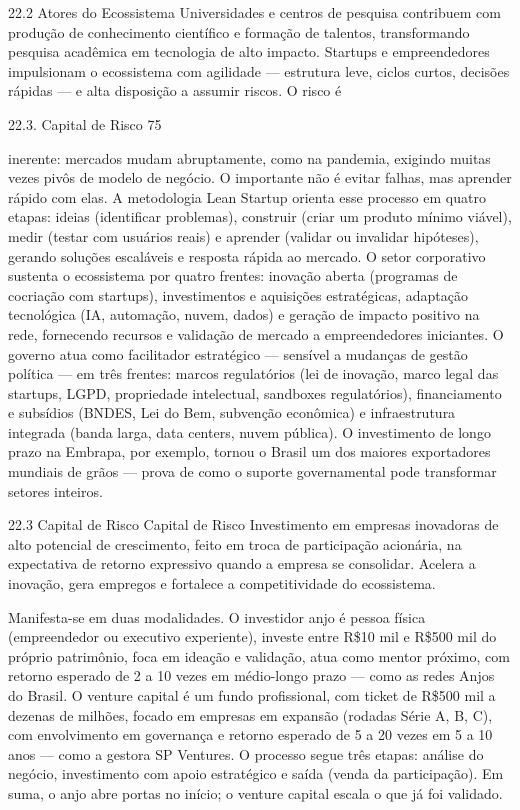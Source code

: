 22.2 Atores do Ecossistema Universidades e centros de pesquisa contribuem com produção de conhecimento científico e formação de talentos, transformando pesquisa acadêmica em tecnologia de alto impacto. Startups e empreendedores impulsionam o ecossistema com agilidade — estrutura leve, ciclos curtos, decisões rápidas — e alta disposição a assumir riscos. O risco é

22.3. Capital de Risco 75

inerente: mercados mudam abruptamente, como na pandemia, exigindo muitas vezes pivôs de modelo de negócio. O importante não é evitar falhas, mas aprender rápido com elas. A metodologia Lean Startup orienta esse processo em quatro etapas: ideias (identificar problemas), construir (criar um produto mínimo viável), medir (testar com usuários reais) e aprender (validar ou invalidar hipóteses), gerando soluções escaláveis e resposta rápida ao mercado. O setor corporativo sustenta o ecossistema por quatro frentes: inovação aberta (programas de cocriação com startups), investimentos e aquisições estratégicas, adaptação tecnológica (IA, automação, nuvem, dados) e geração de impacto positivo na rede, fornecendo recursos e validação de mercado a empreendedores iniciantes. O governo atua como facilitador estratégico — sensível a mudanças de gestão política — em três frentes: marcos regulatórios (lei de inovação, marco legal das startups, LGPD, propriedade intelectual, sandboxes regulatórios), financiamento e subsídios (BNDES, Lei do Bem, subvenção econômica) e infraestrutura integrada (banda larga, data centers, nuvem pública). O investimento de longo prazo na Embrapa, por exemplo, tornou o Brasil um dos maiores exportadores mundiais de grãos — prova de como o suporte governamental pode transformar setores inteiros.

22.3 Capital de Risco Capital de Risco Investimento em empresas inovadoras de alto potencial de crescimento, feito em troca de participação acionária, na expectativa de retorno expressivo quando a empresa se consolidar. Acelera a inovação, gera empregos e fortalece a competitividade do ecossistema.

Manifesta-se em duas modalidades. O investidor anjo é pessoa física (empreendedor ou executivo experiente), investe entre R\$10 mil e R\$500 mil do próprio patrimônio, foca em ideação e validação, atua como mentor próximo, com retorno esperado de 2 a 10 vezes em médio-longo prazo — como as redes Anjos do Brasil. O venture capital é um fundo profissional, com ticket de R\$500 mil a dezenas de milhões, focado em empresas em expansão (rodadas Série A, B, C), com envolvimento em governança e retorno esperado de 5 a 20 vezes em 5 a 10 anos — como a gestora SP Ventures. O processo segue três etapas: análise do negócio, investimento com apoio estratégico e saída (venda da participação). Em suma, o anjo abre portas no início; o venture capital escala o que já foi validado.

